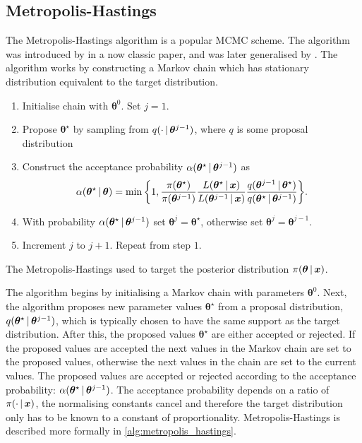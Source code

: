 \subsection{Metropolis-Hastings}
\label{ssec:metropolis_hastings}

The Metropolis-Hastings algorithm is a popular MCMC scheme. The algorithm was introduced
by \textcite{metropolis53} in a now classic paper, and was later generalised by
\textcite{hastings70}. The algorithm works by constructing a Markov chain which has
stationary distribution equivalent to the target distribution.

\begin{algorithm}[tb]
	\begin{enumerate}[start=0, topsep=0pt]
		\item Initialise chain with $\bm{\theta}^{0}$. Set $j=1$.
		\item Propose ${\bm{\theta}}^\star$ by sampling from $q(\cdot \,|\, {\bm{\theta}}^{j-1})$,
		      where $q$ is some proposal distribution
		\item Construct the acceptance probability $\alpha({\bm{\theta}}^\star \,|\,
			      {\bm{\theta}^{j-1}})$ as
		      \begin{equation*}
			      \alpha({\bm{\theta}}^\star \,|\, \bm{\theta}) = \min\bigg\{ 1,
			      \frac{\pi({\bm{\theta}}^\star)}{\pi({\bm{\theta}}^{j-1})} \frac{L(\bm{\theta}^\star \,|\,
				      \bm{x})}{L({\bm{\theta}}^{j-1} \,|\, \bm{x})} \frac{q({\bm{\theta}}^{j-1} \,|\,
				      {\bm{\theta}}^\star)}{q({\bm{\theta}}^\star \,|\, {\bm{\theta}}^{j-1})} \bigg\}.
		      \end{equation*}
		\item With probability $\alpha({\bm{\theta}}^\star \,|\, {\bm{\theta}^{j-1}})$ set
		      ${\bm{\theta}}^j = {\bm{\theta}}^\star$, otherwise set ${\bm{\theta}}^j = {\bm{\theta}}^{j-1}$.
		\item Increment $j$ to $j+1$. Repeat from step $1$.
	\end{enumerate}
	\caption{The Metropolis-Hastings used to target the posterior distribution $\pi(\bm{\theta} \,|\,
			\bm{x})$.}
	\label{alg:metropolis_hastings}
\end{algorithm}

The algorithm begins by initialising a Markov chain with parameters $\bm{\theta}^{0}$.
Next, the algorithm proposes new parameter values ${\bm{\theta}}^\star$ from a proposal
distribution, $q(\bm{\theta}^\star \,|\, {\bm{\theta}}^{j-1})$, which is typically chosen
to have the same support as the target distribution. After this, the proposed values
${\bm{\theta}}^\star$ are either accepted or rejected. If the proposed values are accepted
the next values in the Markov chain are set to the proposed values, otherwise the next
values in the chain are set to the current values. The proposed values are accepted or
rejected according to the acceptance probability: $\alpha({\bm{\theta}}^\star \,|\,
{\bm{\theta}^{j-1}})$.  The acceptance probability depends on a ratio of $\pi(\cdot \,|\,
\bm{x})$, the normalising constants cancel and therefore the target distribution only has
to be known to a constant of proportionality. Metropolis-Hastings is described more
formally in \cref{alg:metropolis_hastings}.

